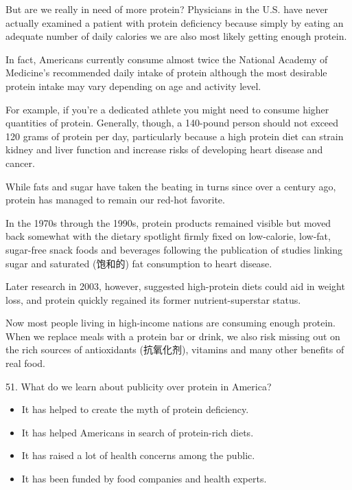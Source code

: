 \documentclass[UTF8,11pt]{ctexart}
\begin{document}
But are we really in need of more protein? Physicians in the U.S. have never actually examined a patient with protein deficiency because simply by eating an adequate number of daily calories we are also most likely getting enough protein.


In fact, Americans currently consume almost twice the National Academy of Medicine’s recommended daily intake of protein although the most desirable protein intake may vary depending on age and activity level.


For example, if you’re a dedicated athlete you might need to consume higher quantities of protein. Generally, though, a 140-pound person should not exceed 120 grams of protein per day, particularly because a high protein diet can strain kidney and liver function and increase risks of developing heart disease and cancer.


While fats and sugar have taken the beating in turns since over a century ago, protein has managed to remain our red-hot favorite.


In the 1970s through the 1990s, protein products remained visible but moved back somewhat with the dietary spotlight firmly fixed on low-calorie, low-fat, sugar-free snack foods and beverages following the publication of studies linking sugar and saturated (饱和的) fat consumption to heart disease.


Later research in 2003, however, suggested high-protein diets could aid in weight loss, and protein quickly regained its former nutrient-superstar status.


Now most people living in high-income nations are consuming enough protein. When we replace meals with a protein bar or drink, we also risk missing out on the rich sources of antioxidants (抗氧化剂), vitamins and many other benefits of real food.


51. What do we learn about publicity over protein in America?


\begin{itemize}[leftmargin=2em,itemsep=.2em,topsep=.4em]\item[A.] It has helped to create the myth of protein deficiency.
\item[B.] It has helped Americans in search of protein-rich diets.
\item[C.] It has raised a lot of health concerns among the public.
\item[D.] It has been funded by food companies and health experts.
\end{itemize}
\end{document}
